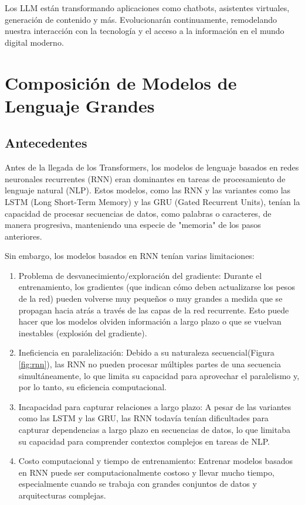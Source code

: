 Los LLM están transformando aplicaciones como chatbots, asistentes virtuales, generación de contenido y más. Evolucionarán continuamente, remodelando nuestra interacción con la tecnología y el acceso a la información en el mundo digital moderno.


\section{Composición de Modelos de Lenguaje Grandes}

\subsection{Antecedentes}

Antes de la llegada de los Transformers, los modelos de lenguaje basados en redes neuronales recurrentes (RNN) eran dominantes en tareas de procesamiento de lenguaje natural (NLP). Estos modelos, como las RNN y las variantes como las LSTM (Long Short-Term Memory) y las GRU (Gated Recurrent Units), tenían la capacidad de procesar secuencias de datos, como palabras o caracteres, de manera progresiva, manteniendo una especie de "memoria" de los pasos anteriores.\cite{IBM-RNN}

Sin embargo, los modelos basados en RNN tenían varias limitaciones:
\begin{enumerate}
    
\item Problema de desvanecimiento/exploración del gradiente: Durante el entrenamiento, los gradientes (que indican cómo deben actualizarse los pesos de la red) pueden volverse muy pequeños o muy grandes a medida que se propagan hacia atrás a través de las capas de la red recurrente. Esto puede hacer que los modelos olviden información a largo plazo o que se vuelvan inestables (explosión del gradiente).
\item Ineficiencia en paralelización: Debido a su naturaleza secuencial(Figura \ref{fig:rnn}), las RNN no pueden procesar múltiples partes de una secuencia simultáneamente, lo que limita su capacidad para aprovechar el paralelismo y, por lo tanto, su eficiencia computacional.
\item Incapacidad para capturar relaciones a largo plazo: A pesar de las variantes como las LSTM y las GRU, las RNN todavía tenían dificultades para capturar dependencias a largo plazo en secuencias de datos, lo que limitaba su capacidad para comprender contextos complejos en tareas de NLP.
\item Costo computacional y tiempo de entrenamiento: Entrenar modelos basados en RNN puede ser computacionalmente costoso y llevar mucho tiempo, especialmente cuando se trabaja con grandes conjuntos de datos y arquitecturas complejas.
\end{enumerate}

